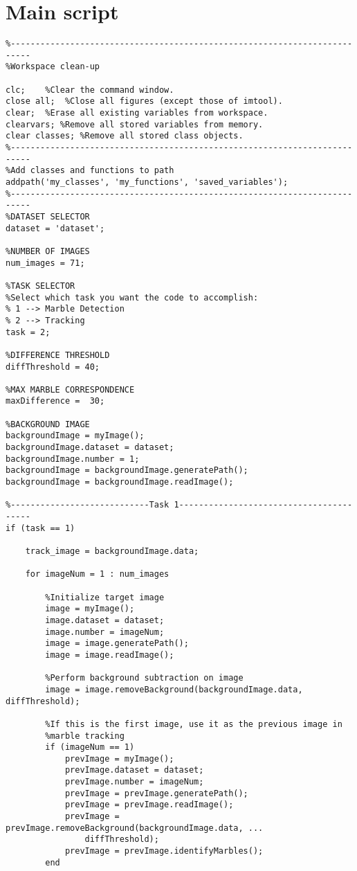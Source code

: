 \documentclass[10pt,a4paper,onecolumn]{report}
\begin{document}
\section{Main script}
\begin{lstlisting}
%--------------------------------------------------------------------------
%Workspace clean-up

clc;    %Clear the command window.
close all;  %Close all figures (except those of imtool).
clear;  %Erase all existing variables from workspace.
clearvars; %Remove all stored variables from memory.
clear classes; %Remove all stored class objects.
%--------------------------------------------------------------------------
%Add classes and functions to path
addpath('my_classes', 'my_functions', 'saved_variables');
%--------------------------------------------------------------------------
%DATASET SELECTOR
dataset = 'dataset';

%NUMBER OF IMAGES
num_images = 71;

%TASK SELECTOR
%Select which task you want the code to accomplish:
% 1 --> Marble Detection
% 2 --> Tracking
task = 2;

%DIFFERENCE THRESHOLD
diffThreshold = 40;

%MAX MARBLE CORRESPONDENCE
maxDifference =  30;

%BACKGROUND IMAGE
backgroundImage = myImage();
backgroundImage.dataset = dataset;
backgroundImage.number = 1;
backgroundImage = backgroundImage.generatePath();
backgroundImage = backgroundImage.readImage();

%----------------------------Task 1----------------------------------------
if (task == 1)
    
    track_image = backgroundImage.data;
    
    for imageNum = 1 : num_images
        
        %Initialize target image
        image = myImage();
        image.dataset = dataset;
        image.number = imageNum;
        image = image.generatePath();
        image = image.readImage();

        %Perform background subtraction on image
        image = image.removeBackground(backgroundImage.data, diffThreshold);
        
        %If this is the first image, use it as the previous image in
        %marble tracking
        if (imageNum == 1)
            prevImage = myImage();
            prevImage.dataset = dataset;
            prevImage.number = imageNum;
            prevImage = prevImage.generatePath();
            prevImage = prevImage.readImage();
            prevImage = prevImage.removeBackground(backgroundImage.data, ...
                diffThreshold);
            prevImage = prevImage.identifyMarbles();
        end 
        

\end{lstlisting}
\end{document}
